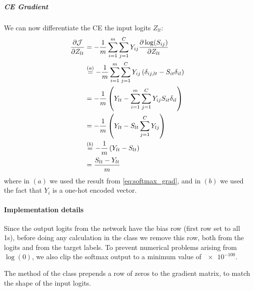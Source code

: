 \subparagraph{\ac{CE} Gradient} We can now differentiate the \ac{CE} \wrt the input logits $Z_{lt}$:
\begin{equation}
\begin{split}
    \pdv{\mathcal{J}}{Z_{lt}} &= -\frac{1}{m} \sum_{i=1}^{m} \sum_{j=1}^{C} Y_{ij} \pdv{\log(S_{ij})}{Z_{lt}}\\
    &\overset{(a)}{=} -\frac{1}{m} \sum_{i=1}^{m} \sum_{j=1}^{C} Y_{ij} \left(\delta_{ij,lt} - S_{it} \delta_{il} \right)\\
    &= -\frac{1}{m} \left( Y_{lt} - \sum_{i=1}^{m} \sum_{j=1}^{C} Y_{ij} S_{it} \delta_{il} \right)\\
    &= -\frac{1}{m} \left( Y_{lt} - S_{lt} \sum_{j=1}^{C} Y_{lj} \right)\\
    &\overset{(b)}{=} -\frac{1}{m} \left( Y_{lt} - S_{lt} \right)\\
    &= \frac{S_{lt} - Y_{lt}}{m}
\end{split}
\end{equation}
where in $(a)$ we used the result from \cref{eq:softmax_grad}, and in $(b)$ we used the fact that $Y_i$ is a one-hot encoded vector.

\paragraph{Implementation details} Since the output logits from the network have the bias row (first row set to all 1s), before doing any calculation in the  class we remove this row, both from the logits and from the target labels. To prevent numerical problems arising from $\log(0)$, we also clip the softmax output to a minimum value of $\num{e-100}$.

The  method of the  class prepends a row of zeros to the gradient matrix, to match the shape of the input logits.
